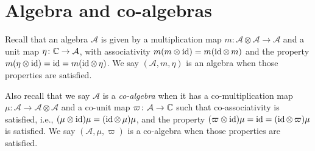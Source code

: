 \chapter{Algebra and co-algebras}

 Recall that an algebra $\mathcal{A}$ is given by a multiplication map $m\colon \mathcal{A}\otimes\mathcal{A}\to\mathcal{A}$ and a unit map $\eta\colon \mathbb{C}\to\mathcal{A}$, with associativity $m(m\otimes\operatorname{id})=m(\operatorname{id}\otimes\,m)$ and the property $m(\eta\otimes\operatorname{id})=\operatorname{id}=m(\operatorname{id}\otimes\,\eta)$. We say $(\mathcal{A},m,\eta)$ is an algebra when those properties are satisfied.

 Also recall that we say $\mathcal{A}$ is a \textit{co-algebra} when it has a co-multiplication map $\mu\colon\mathcal{A}\to\mathcal{A}\otimes\mathcal{A}$ and a co-unit map $\varpi\colon\mathcal{A}\to\mathbb{C}$ such that co-associativity is satisfied, i.e., $(\mu\otimes\operatorname{id})\mu=(\operatorname{id}\otimes\,\mu)\mu$, and the property $(\varpi\otimes\operatorname{id})\mu=\operatorname{id}=(\operatorname{id}\otimes\,\varpi)\mu$ is satisfied.
 We say $(\mathcal{A},\mu,\varpi)$ is a co-algebra when those properties are satisfied.

